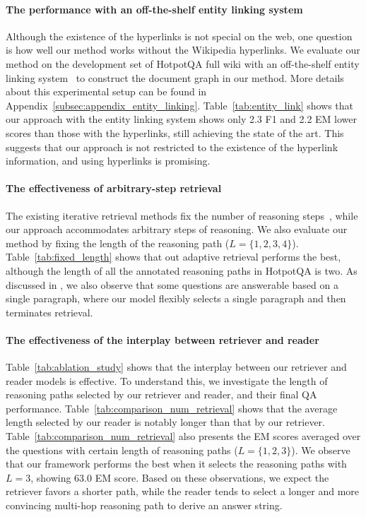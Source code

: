\vspace{-2mm}\paragraph{The performance with an off-the-shelf entity linking system}
Although the existence of the hyperlinks is not special on the web, one question is how well our method works without the Wikipedia hyperlinks.
We evaluate our method on the development set of HotpotQA full wiki with an off-the-shelf entity linking system~\citep{ferragina2011fast} to construct the document graph in our method.
More details about this experimental setup can be found in Appendix~\ref{subsec:appendix_entity_linking}. 
Table~\ref{tab:entity_link} shows that our approach with the entity linking system shows only 2.3 F1 and 2.2 EM lower scores than those with the hyperlinks, still achieving the state of the art.
This suggests that our approach is not restricted to the existence of the hyperlink information, and using hyperlinks is promising.

\vspace{-2mm}\paragraph{The effectiveness of arbitrary-step retrieval}
The existing iterative retrieval methods fix the number of reasoning steps~\citep{qi2019answering,das2019multi,godbole2019entity_links,muppet2019multihop}, while our approach accommodates arbitrary steps of reasoning.
We also evaluate our method by fixing the length of the reasoning path ($L = \{1,2,3,4\}$).
Table~\ref{tab:fixed_length} shows that out adaptive retrieval performs the best, although the length of all the annotated reasoning paths in HotpotQA is two.
As discussed in \cite{min2019compositional}, we also observe that some questions are answerable based on a single paragraph, where our model flexibly selects a single paragraph and then terminates retrieval.

\vspace{-2mm}
\paragraph{The effectiveness of the interplay between retriever and reader}
Table~\ref{tab:ablation_study} shows that the interplay between our retriever and reader models is effective.
To understand this, we investigate the length of reasoning paths selected by our retriever and reader, and their final QA performance.
Table~\ref{tab:comparison_num_retrieval} shows that the average length selected by our reader is notably longer than that by our retriever.
Table~\ref{tab:comparison_num_retrieval} also presents the EM scores averaged over the questions with certain length of reasoning paths ($L=\{1, 2,3\}$). 
We observe that our framework performs the best when it selects the reasoning paths with $L=3$, showing 63.0 EM score.
Based on these observations, we expect the retriever favors a shorter path, while the reader tends to select a longer and more convincing multi-hop reasoning path to derive an answer string. 

